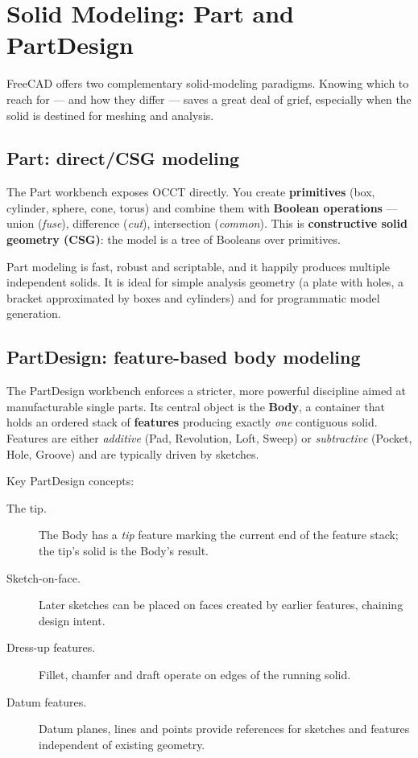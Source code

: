 \chapter{Solid Modeling: Part and PartDesign}
\label{ch:part-partdesign}

FreeCAD offers two complementary solid-modeling paradigms. Knowing which
to reach for --- and how they differ --- saves a great deal of grief,
especially when the solid is destined for meshing and analysis.

\section{Part: direct/CSG modeling}

The \textsf{Part} workbench exposes OCCT directly. You create
\textbf{primitives} (box, cylinder, sphere, cone, torus) and combine them
with \textbf{Boolean operations} --- union (\emph{fuse}), difference
(\emph{cut}), intersection (\emph{common}). This is
\textbf{constructive solid geometry (CSG)}: the model is a tree of
Booleans over primitives.

Part modeling is fast, robust and scriptable, and it happily produces
multiple independent solids. It is ideal for simple analysis geometry
(a plate with holes, a bracket approximated by boxes and cylinders) and
for programmatic model generation.

\section{PartDesign: feature-based body modeling}

The \textsf{PartDesign} workbench enforces a stricter, more powerful
discipline aimed at manufacturable single parts. Its central object is
the \textbf{Body}, a container that holds an ordered stack of
\textbf{features} producing exactly \emph{one} contiguous solid. Features
are either \emph{additive} (Pad, Revolution, Loft, Sweep) or
\emph{subtractive} (Pocket, Hole, Groove) and are typically driven by
sketches.

Key PartDesign concepts:

\begin{description}
  \item[The tip.] The Body has a \emph{tip} feature marking the current
        end of the feature stack; the tip's solid is the Body's result.
  \item[Sketch-on-face.] Later sketches can be placed on faces created by
        earlier features, chaining design intent.
  \item[Dress-up features.] Fillet, chamfer and draft operate on edges
        of the running solid.
  \item[Datum features.] Datum planes, lines and points provide
        references for sketches and features independent of existing
        geometry.
\end{description}

